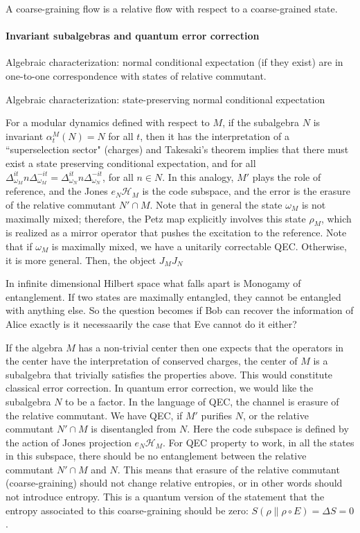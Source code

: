 \documentclass[a4paper,11pt]{article}
\theoremstyle{definition}
\newcommand{\mH}{\mathcal{H}}
\begin{document}
A coarse-graining flow is a relative flow with respect to a coarse-grained state.

\paragraph{Invariant subalgebras and quantum error correction}

Algebraic characterization: normal conditional expectation (if they exist) are in one-to-one correspondence with states of relative commutant.

Algebraic characterization: state-preserving normal conditional expectation



For a modular dynamics defined with respect to $M$, if the subalgebra $N$ is invariant $\alpha_t^M(N)=N$ for all $t$, then it has the interpretation of a ``superselection sector" (charges) and Takesaki's theorem implies that there must exist a state preserving conditional expectation, and for all $\Delta_{\omega_M}^{it} n\Delta_{\omega_M}^{-it}=\Delta_{\omega_N}^{it}n\Delta_{\omega_N}^{-it}$, for all $n\in N$. In this analogy, $M'$ plays the role of reference, and the Jones $e_N\mathcal{H}_M$ is the code subspace, and the error is the erasure of the relative commutant $N'\cap M$. Note that in general the state $\omega_M$ is not maximally mixed; therefore, the Petz map explicitly involves this state $\rho_M$, which is realized as a mirror operator that pushes the excitation to the reference. Note that if $\omega_M$ is maximally mixed, we have a unitarily correctable QEC. Otherwise, it is more general. Then, the object $J_M J_N$

In infinite dimensional Hilbert space what falls apart is Monogamy of entanglement. If two states are maximally entangled, they cannot be entangled with anything else. So the question becomes if Bob can recover the information of Alice exactly is it necessaarily the case that Eve cannot do it either? 

If the algebra $M$ has a non-trivial center then one expects that the operators in the center have the interpretation of conserved charges, the center of $M$ is a subalgebra that trivially satisfies the properties above. This would constitute classical error correction. In quantum error correction, we would like the subalgebra $N$ to be a factor. In the language of QEC, the channel is erasure of the relative commutant. We have QEC, if $M'$ purifies $N$, or the relative commutant $N'\cap M$ is disentangled from $N$. Here the code subspace is defined by the action of Jones projection $e_N\mH_M$. For QEC property to work, in all the states in this subspace, there should be no entanglement between the relative commutant $N'\cap M$ and $N$. This means that erasure of the relative commutant (coarse-graining) should not change relative entropies, or in other words should not introduce entropy. This is a quantum version of the statement that the entropy associated to this coarse-graining should be zero: $S(\rho\|\rho\circ E)=\Delta S=0$.
\end{document}
